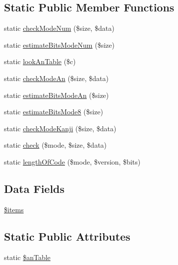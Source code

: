 \subsection*{Static Public Member Functions}
\begin{DoxyCompactItemize}
\item 
static \hyperlink{class_q_rinput_a57451029723cde8347098dea7eabb8db}{check\-Mode\-Num} (\$size, \$data)
\item 
static \hyperlink{class_q_rinput_aa42b996fbff281fa01d5a202a38ce43f}{estimate\-Bits\-Mode\-Num} (\$size)
\item 
static \hyperlink{class_q_rinput_a1b6c565bec384d2fb500147dc20fed3a}{look\-An\-Table} (\$c)
\item 
static \hyperlink{class_q_rinput_add3eed60efd4da1dfcfb1fc4217a95f0}{check\-Mode\-An} (\$size, \$data)
\item 
static \hyperlink{class_q_rinput_aaa071259baa5ac76a84c573467f27a25}{estimate\-Bits\-Mode\-An} (\$size)
\item 
static \hyperlink{class_q_rinput_a308300a85bc46506ec5a734bde289317}{estimate\-Bits\-Mode8} (\$size)
\item 
static \hyperlink{class_q_rinput_a38f007ce0abd312f8697953b6c456105}{check\-Mode\-Kanji} (\$size, \$data)
\item 
static \hyperlink{class_q_rinput_a45e1994f56dd5f3183e08d475e9757c0}{check} (\$mode, \$size, \$data)
\item 
static \hyperlink{class_q_rinput_a369d51897f4471e4edf4dfa2b2bf22aa}{length\-Of\-Code} (\$mode, \$version, \$bits)
\end{DoxyCompactItemize}
\subsection*{Data Fields}
\begin{DoxyCompactItemize}
\item 
\hyperlink{class_q_rinput_a737abdef83dabb219182c1e88887c6c3}{\$items}
\end{DoxyCompactItemize}
\subsection*{Static Public Attributes}
\begin{DoxyCompactItemize}
\item 
static \hyperlink{class_q_rinput_ab60a6875b03625230e309bc73343f153}{\$an\-Table}
\end{DoxyCompactItemize}


